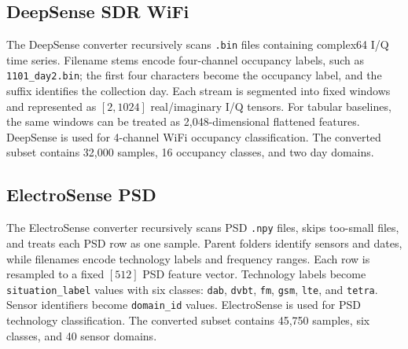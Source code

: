 \documentclass{ieeeaccess}
\newcommand{\artifact}[1]{\texttt{#1}}
\begin{document}
\subsection{DeepSense SDR WiFi}

The DeepSense converter recursively scans \artifact{.bin} files containing complex64 I/Q time series. Filename stems encode four-channel occupancy labels, such as \artifact{1101\_day2.bin}; the first four characters become the occupancy label, and the suffix identifies the collection day. Each stream is segmented into fixed windows and represented as $[2, 1024]$ real/imaginary I/Q tensors. For tabular baselines, the same windows can be treated as 2,048-dimensional flattened features. DeepSense is used for 4-channel WiFi occupancy classification. The converted subset contains 32,000 samples, 16 occupancy classes, and two day domains.

\subsection{ElectroSense PSD}

The ElectroSense converter recursively scans PSD \artifact{.npy} files, skips too-small files, and treats each PSD row as one sample. Parent folders identify sensors and dates, while filenames encode technology labels and frequency ranges. Each row is resampled to a fixed $[512]$ PSD feature vector. Technology labels become \artifact{situation\_label} values with six classes: \artifact{dab}, \artifact{dvbt}, \artifact{fm}, \artifact{gsm}, \artifact{lte}, and \artifact{tetra}. Sensor identifiers become \artifact{domain\_id} values. ElectroSense is used for PSD technology classification. The converted subset contains 45,750 samples, six classes, and 40 sensor domains.
\end{document}
